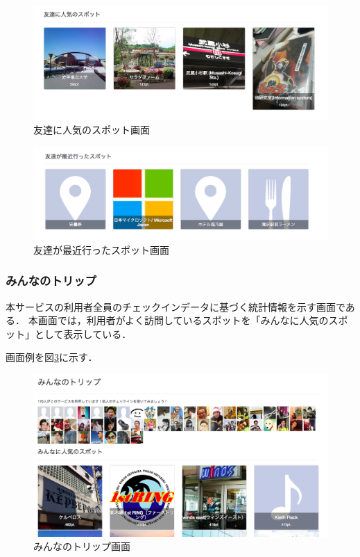 \documentclass{jsarticle}
\begin{document}
\begin{figure}[!ht]
\begin{center}
\includegraphics[width=12.0cm]{./image/cheekitrip_friends_popular_spot.png}
\caption{友達に人気のスポット画面}
\label{cheekitrip_friends_popular_spot}
\end{center}
\end{figure}

\begin{figure}[!ht]
\begin{center}
\includegraphics[width=12.0cm]{./image/cheekitrip_friends_recently_spot.png}
\caption{友達が最近行ったスポット画面}
\label{cheekitrip_friends_recently_spot}
\end{center}
\end{figure}

\subsubsection{みんなのトリップ}

本サービスの利用者全員のチェックインデータに基づく統計情報を示す画面である．
本画面では，利用者がよく訪問しているスポットを「みんなに人気のスポット」として表示している．

画面例を図\ref{cheekitrip_everyone}に示す．


\begin{figure}[!ht]
\begin{center}
\includegraphics[width=12.0cm]{./image/cheekitrip_everyone.png}
\caption{みんなのトリップ画面}
\label{cheekitrip_everyone}
\end{center}
\end{figure}
\end{document}
